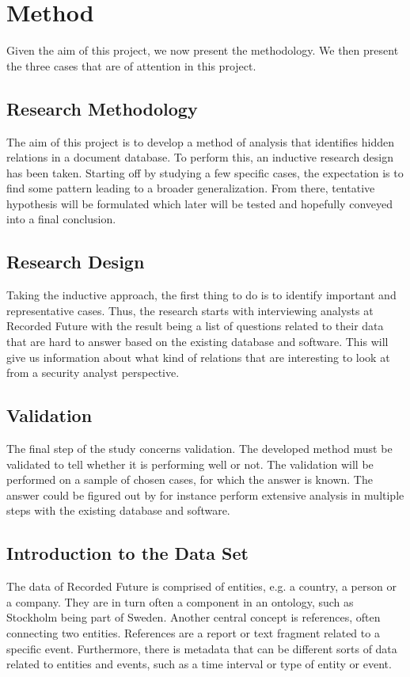 \chapter{Method}
Given the aim of this project, we now present the methodology. We then present the three cases that are of attention in this project.


\section{Research Methodology}
The aim of this project is to develop a method of analysis that identifies hidden relations in a document database. To perform this, an inductive research design has been taken. Starting off by studying a few specific cases, the expectation is to find some pattern leading to a broader generalization. From there, tentative hypothesis will be formulated which later will be tested and hopefully conveyed into a final conclusion.

\section{Research Design}
Taking the inductive approach, the first thing to do is to identify important and representative cases. Thus, the research starts with interviewing analysts at Recorded Future with the result being a list of questions related to their data that are hard to answer based on the existing database and software. This will give us information about what kind of relations that are interesting to look at from a security analyst perspective.

\section{Validation} 
The final step of the study concerns validation. The developed method must be validated to tell whether it is performing well or not. The validation will be performed on a sample of chosen cases, for which the answer is known. The answer could be figured out by for instance perform extensive analysis in multiple steps with the existing database and software.

\section{Introduction to the Data Set \label{dataset}}
The data of Recorded Future is comprised of entities, e.g. a country, a person or a company. They are in turn often a component in an ontology, such as Stockholm being part of Sweden. Another central concept is references, often connecting two entities. References are a report or text fragment related to a specific event. Furthermore, there is metadata that can be different sorts of data related to entities and events, such as a time interval or type of entity or event.

